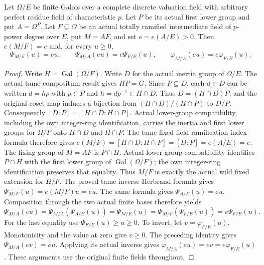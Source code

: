\begin{lemma}
\label{fw:wild-compositum-herbrand-scaling}
\leanok
Let $\Omega/E$ be finite Galois over a complete discrete valuation
field with arbitrary perfect residue field of characteristic $p$.
Let $P$ be its actual first lower group and put $A=\Omega^P$.
Let $F\subseteq\Omega$ be an actual totally ramified intermediate
field of $p$-power degree over $E$, put $M=AF$, and set
$e=e(A/E)>0$. Then $e(M/F)=e$ and, for every $u\geq0$,
\[
 \Psi_{M/F}(u)=eu,\qquad
 \Psi_{M/A}(eu)=e\Psi_{F/E}(u),\qquad
 \varphi_{M/A}(eu)=e\varphi_{F/E}(u).
\]
\end{lemma}
\begin{proof}
Write $H=\operatorname{Gal}(\Omega/F)$.
Write $D$ for the actual inertia group of $\Omega/E$.
The actual tame-compositum result gives $HP=G$.
Since $P\subseteq D$, each $d\in D$ can be written $d=hp$
with $p\in P$ and $h=dp^{-1}\in H\cap D$.
Thus $D=(H\cap D)P$, and the original coset map induces a
bijection from $(H\cap D)/(H\cap P)$ to $D/P$.
Consequently
$[D:P]=[H\cap D:H\cap P]$.
Actual lower-group compatibility, including the own integer-ring
identification, carries the inertia and first lower groups
for $\Omega/F$ onto $H\cap D$ and $H\cap P$.
The tame fixed-field ramification-index formula therefore gives
$e(M/F)=[H\cap D:H\cap P]=[D:P]=e(A/E)=e$.
The fixing group of $M=A F$ is $P\cap H$.
Actual lower-group compatibility identifies $P\cap H$ with the
first lower group of $\operatorname{Gal}(\Omega/F)$; the own
integer-ring identification preserves that equality.
Thus $M/F$ is exactly the actual wild fixed extension for
$\Omega/F$. The proved tame inverse Herbrand formula gives
$\Psi_{M/F}(u)=e(M/F)u=eu$.
The same formula gives $\Psi_{A/E}(u)=eu$.
Composition through the two actual finite bases therefore yields
\[
 \Psi_{M/A}(eu)=\Psi_{M/A}(\Psi_{A/E}(u))
 =\Psi_{M/E}(u)
 =\Psi_{M/F}(\Psi_{F/E}(u))=e\Psi_{F/E}(u).
\]
For the last equality use $\Psi_{F/E}(u)\geq u\geq0$.
To invert, let $v=\varphi_{F/E}(u)$.
Monotonicity and the value at zero give $v\geq0$.
The preceding identity gives $\Psi_{M/A}(ev)=eu$.
Applying its actual inverse gives
$\varphi_{M/A}(eu)=ev=e\varphi_{F/E}(u)$.
These arguments use the original finite fields throughout.
\end{proof}

